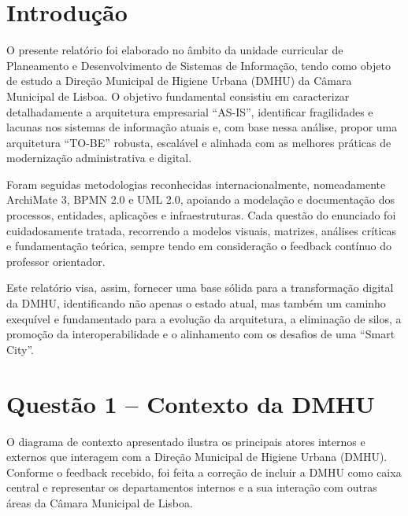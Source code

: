 \documentclass[12pt,a4paper,final]{article}
\begin{document}
    \renewcommand{\contentsname}{Índice}
    \cleardoublepage
    \tableofcontents
    \newpage
    \listoffigures
    \newpage
    \listoftables
    \newpage
    \cleardoublepage

    \section*{Introdução}

    O presente relatório foi elaborado no âmbito da unidade curricular de Planeamento e Desenvolvimento de Sistemas de Informação, tendo como objeto de estudo a Direção Municipal de Higiene Urbana (DMHU) da Câmara Municipal de Lisboa. O objetivo fundamental consistiu em caracterizar detalhadamente a arquitetura empresarial “AS-IS”, identificar fragilidades e lacunas nos sistemas de informação atuais e, com base nessa análise, propor uma arquitetura “TO-BE” robusta, escalável e alinhada com as melhores práticas de modernização administrativa e digital.

    Foram seguidas metodologias reconhecidas internacionalmente, nomeadamente ArchiMate 3, BPMN 2.0 e UML 2.0, apoiando a modelação e documentação dos processos, entidades, aplicações e infraestruturas. Cada questão do enunciado foi cuidadosamente tratada, recorrendo a modelos visuais, matrizes, análises críticas e fundamentação teórica, sempre tendo em consideração o feedback contínuo do professor orientador.

    Este relatório visa, assim, fornecer uma base sólida para a transformação digital da DMHU, identificando não apenas o estado atual, mas também um caminho exequível e fundamentado para a evolução da arquitetura, a eliminação de silos, a promoção da interoperabilidade e o alinhamento com os desafios de uma “Smart City”.


    \section*{Questão 1 – Contexto da DMHU}

    O diagrama de contexto apresentado ilustra os principais atores internos e externos que interagem com a Direção Municipal de Higiene Urbana (DMHU). Conforme o feedback recebido, foi feita a correção de incluir a DMHU como caixa central e representar os departamentos internos e a sua interação com outras áreas da Câmara Municipal de Lisboa.
\end{document}
